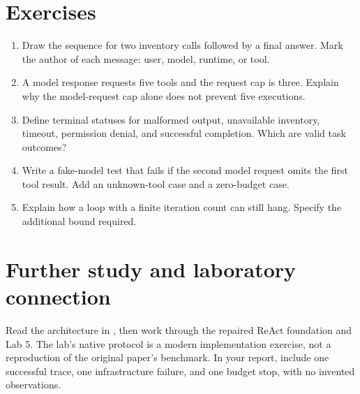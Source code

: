 \section{Exercises}
\begin{enumerate}
\item Draw the sequence for two inventory calls followed by a final answer. Mark the author of each message: user, model, runtime, or tool.
\item A model response requests five tools and the request cap is three. Explain why the model-request cap alone does not prevent five executions.
\item Define terminal statuses for malformed output, unavailable inventory, timeout, permission denial, and successful completion. Which are valid task outcomes?
\item Write a fake-model test that fails if the second model request omits the first tool result. Add an unknown-tool case and a zero-budget case.
\item Explain how a loop with a finite iteration count can still hang. Specify the additional bound required.
\end{enumerate}

\section{Further study and laboratory connection}
Read the architecture in \cite{react}, then work through the repaired ReAct foundation and Lab 5. The lab's native protocol is a modern implementation exercise, not a reproduction of the original paper's benchmark. In your report, include one successful trace, one infrastructure failure, and one budget stop, with no invented observations.

